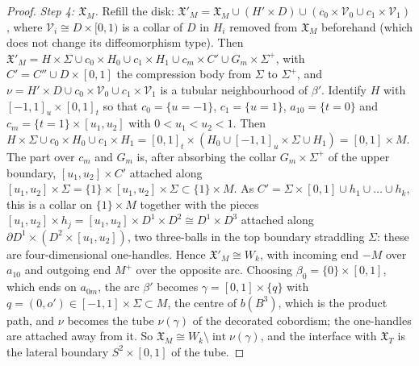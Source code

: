 \documentclass[11pt]{amsart}
\theoremstyle{definition}
\theoremstyle{remark}
\theoremstyle{plain}
\numberwithin{equation}{section}
\begin{document}
\begin{proof}
\emph{Step 4: $\mathfrak X_M$.} Refill the disk: $\mathfrak X'_M=\mathfrak X_M\cup(H'\times D)\cup
(c_0\times \mathcal V_0\cup c_1\times \mathcal V_1)$, where $\mathcal V_i\cong D\times[0,1)$ is a collar of $D$ in $H_i$ removed
from $\mathfrak X_M$ beforehand (which does not change its diffeomorphism type). Then
$\mathfrak X'_M=H\times\Sigma\cup c_0\times H_0\cup c_1\times H_1\cup c_m\times C'\cup G_m\times\Sigma^+$, with
$C'=C''\cup D\times[0,1]$ the compression body from $\Sigma$ to $\Sigma^+$, and
$\nu=H'\times D\cup c_0\times \mathcal V_0\cup c_1\times \mathcal V_1$ is a tubular neighbourhood of $\beta'$. Identify
$H$ with $[-1,1]_u\times[0,1]_t$ so that $c_0=\{u=-1\}$, $c_1=\{u=1\}$, $a_{10}=\{t=0\}$ and
$c_m=\{t=1\}\times[u_1,u_2]$ with $0<u_1<u_2<1$. Then $H\times\Sigma\cup c_0\times H_0\cup c_1\times H_1=[0,1]_t\times(H_0\cup[-1,1]_u\times\Sigma
\cup H_1)=[0,1]\times M$. The part over $c_m$ and $G_m$ is, after absorbing the collar
$G_m\times\Sigma^+$ of the upper boundary, $[u_1,u_2]\times C'$ attached along $[u_1,u_2]\times\Sigma=\{1\}\times[u_1,u_2]\times\Sigma\subset\{1\}\times M$. As
$C'=\Sigma\times[0,1]\cup h_1\cup\dots\cup h_k$, this is a collar on $\{1\}\times M$ together with
the pieces $[u_1,u_2]\times h_j=[u_1,u_2]\times D^1\times D^2\cong D^1\times D^3$ attached along
$\partial D^1\times(D^2\times[u_1,u_2])$, two three-balls in the top boundary straddling
$\Sigma$: these are four-dimensional one-handles. Hence $\mathfrak X'_M\cong W_k$, with
incoming end $-M$ over $a_{10}$ and outgoing end $M^+$ over the opposite arc. Choosing
$\beta_0=\{0\}\times[0,1]$, which ends on $a_{0m}$, the arc $\beta'$ becomes $\gamma=[0,1]\times\{q\}$
with $q=(0,o')\in[-1,1]\times\Sigma\subset M$, the centre of $b(B^3)$, which is the product
path, and $\nu$ becomes the tube $\nu(\gamma)$ of the decorated cobordism; the
one-handles are attached away from it. So
$\mathfrak X_M\cong W_k\setminus\operatorname{int}\nu(\gamma)$, and the interface with $\mathfrak X_T$ is the lateral
boundary $S^2\times[0,1]$ of the tube.


\end{proof}
\end{document}
